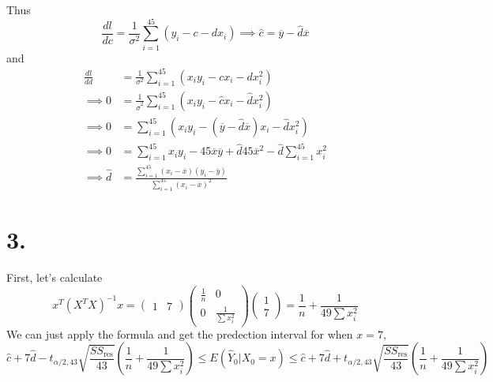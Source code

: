 \documentclass[11pt]{article}
\theoremstyle{mystyle}
\theoremstyle{definition}
\begin{document}
Thus 
\[
  \displaystyle\frac{dl}{dc} = \displaystyle\frac{1}{\sigma^2} \sum_{i=1}^{45} (y_i - c - d x_i) \implies \hat c = \overline y - \hat d \overline x
\]
and 
\begin{align*}
  \displaystyle\frac{dl}{dd} &= \displaystyle\frac{1}{\sigma^2} \sum_{i=1}^{45} (x_i y_i - c x_i - d x_i^2)  \\
  \implies 0 &= \displaystyle\frac{1}{\hat \sigma^2} \sum_{i=1}^{45} (x_i y_i - \hat c x_i - \hat d x_i^2) \\
  \implies 0 &= \sum_{i=1}^{45} (x_i y_i - (\overline y - \hat d \overline x) x_i - \hat d x_i^2) \\
  \implies 0 &= \sum_{i=1}^{45} x_i y_i - 45 \overline x \overline y + \hat d 45 \overline x ^2 - \hat d \sum_{i=1}^{45} x_i^2 \\
  \implies \hat d &= \displaystyle\frac{\sum_{i=1}^{45} (x_i - \overline x)(y_i - \overline y)}{\sum_{i=1}^{45} (x_i - \overline x)^2}
\end{align*}
\pagebreak
\section*{3.}
First, let's calculate 
\[
  x^T (X^T X)^{-1} x = 
  \begin{pmatrix}
    1 & 7
  \end{pmatrix}
  \begin{pmatrix}
    \displaystyle\frac{1}{n} & 0 \\
    0 & \displaystyle\frac{1}{\sum x_i^2}
  \end{pmatrix}
  \begin{pmatrix}
    1 \\ 
    7
  \end{pmatrix}
  = \frac{1}{n} + \displaystyle\frac{1}{49 \sum x_i^2} 
\]
We can just apply the formula and get the predection interval for when $x=7$,
\[
  \hat c + 7 \hat d - t_{\alpha/2,43} \sqrt{\displaystyle\frac{SS_\text{res}}{43}} \left(\frac{1}{n} + \displaystyle\frac{1}{49 \sum x_i^2} \right) \le E(\hat Y_0 | X_0 = x) \le \hat c + 7 \hat d + t_{\alpha/2,43} \sqrt{\displaystyle\frac{SS_\text{res}}{43}} \left(\frac{1}{n} + \displaystyle\frac{1}{49 \sum x_i^2} \right) 
\]
\end{document}
